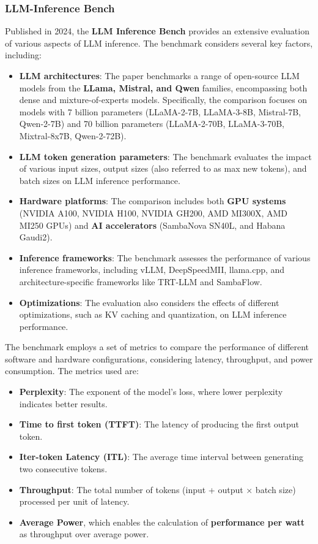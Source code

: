 \documentclass[conference]{IEEEtran}
\begin{document}
\subsubsection{LLM-Inference Bench}
Published in 2024, the \textbf{LLM Inference Bench} \cite{LLMInfbench} provides an extensive evaluation of various aspects of LLM inference. The benchmark considers several key factors, including:
\begin{itemize}
\item \textbf{LLM architectures}: The paper benchmarks a range of open-source LLM models from the \textbf{LLama, Mistral, and Qwen} families, encompassing both dense and mixture-of-experts models. Specifically, the comparison focuses on models with 7 billion parameters (LLaMA-2-7B, LLaMA-3-8B, Mistral-7B, Qwen-2-7B) and 70 billion parameters (LLaMA-2-70B, LLaMA-3-70B, Mixtral-8x7B, Qwen-2-72B).
\item \textbf{LLM token generation parameters}: The benchmark evaluates the impact of various input sizes, output sizes (also referred to as max new tokens), and batch sizes on LLM inference performance.
\item \textbf{Hardware platforms}: The comparison includes both \textbf{GPU systems} (NVIDIA A100, NVIDIA H100, NVIDIA GH200, AMD MI300X, AMD MI250 GPUs) and \textbf{AI accelerators} (SambaNova SN40L, and Habana Gaudi2).
\item \textbf{Inference frameworks}: The benchmark assesses the performance of various inference frameworks, including vLLM, DeepSpeedMII, llama.cpp, and architecture-specific frameworks like TRT-LLM and SambaFlow.
\item \textbf{Optimizations}: The evaluation also considers the effects of different optimizations, such as KV caching and quantization, on LLM inference performance.
\end{itemize}

The benchmark employs a set of metrics to compare the performance of different software and hardware configurations, considering latency, throughput, and power consumption. The metrics used are:
\begin{itemize}
\item \textbf{Perplexity}: The exponent of the model's loss, where lower perplexity indicates better results.
\item \textbf{Time to first token (TTFT)}: The latency of producing the first output token.
\item \textbf{Iter-token Latency (ITL)}: The average time interval between generating two consecutive tokens.
\item \textbf{Throughput}: The total number of tokens (input + output × batch size) processed per unit of latency.
\item \textbf{Average Power}, which enables the calculation of \textbf{performance per watt} as throughput over average power.
\end{itemize}
\end{document}
